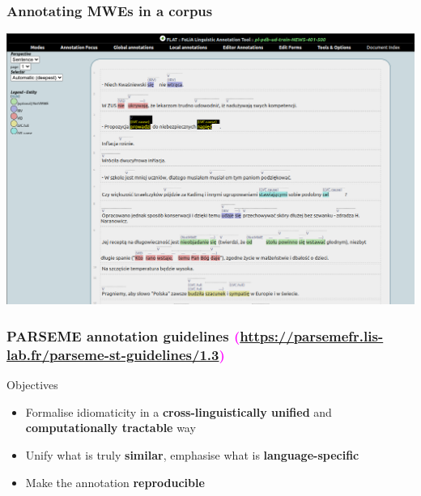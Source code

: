 \documentclass[xcolor=dvipsnames]{beamer}
\begin{document}
\begin{frame} 
\frametitle{Annotating MWEs in a corpus}

\includegraphics[scale=0.27]{Images/flat-pl.png}

\end{frame}

\begin{frame}
  \frametitle{PARSEME annotation guidelines \textcolor{magenta}{{\scriptsize (\url{https://parsemefr.lis-lab.fr/parseme-st-guidelines/1.3})}}}


\vspace{-0.2cm}

\begin{block}{Objectives} 
\begin{itemize}
\item Formalise idiomaticity in a \textbf{cross-linguistically unified} and \textbf{computationally tractable} way
\item Unify what is truly \textbf{similar}, emphasise what is \textbf{language-specific}
\item Make the annotation \textbf{reproducible}
\end{itemize}
\end{block}


\end{frame}
\end{document}
